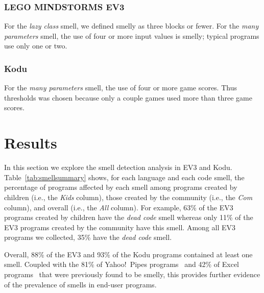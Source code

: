 \documentclass[conference]{IEEEtran}
\newcommand{\ms}{LEGO MINDSTORMS EV3}
\begin{document}
\subsubsection{\ms}
For the \emph{lazy class} smell, we defined smelly as three blocks or fewer. For the \emph{many parameters} smell, the use of four or more input values is smelly;  typical programs use only one or two. 

\subsubsection{Kodu}
For the  \emph{many parameters} smell, the use of four or more game scores. Thus thresholds was chosen because only a couple games used more than three game scores. 


\section{Results}
\label{sec:results}
In this section we explore the smell detection analysis in EV3 and Kodu. 
Table~\ref{tab:smellsummary} shows, for each language and each code smell, the percentage of programs affected by each smell among programs created by children (i.e., the \emph{Kids} column), those created by the community (i.e., the \emph{Com} column), and overall (i.e., the \emph{All} column). For example, 63\% of the EV3 programs created by children have the \emph{dead code} smell whereas only 11\% of the EV3 programs created by the community have this smell. Among all EV3 programs we collected, 35\% have the \emph{dead code} smell. 
 
Overall, 88\% of the EV3 and 93\% of the Kodu programs contained at least one smell. Coupled with the 81\% of Yahoo!\ Pipes programs~\cite{StoleeTSE2013} and 42\% of Excel programs~\cite{Hermans2012intra} that were previously found to be smelly, this provides further evidence of the prevalence of smells in end-user programs. 
\end{document}
